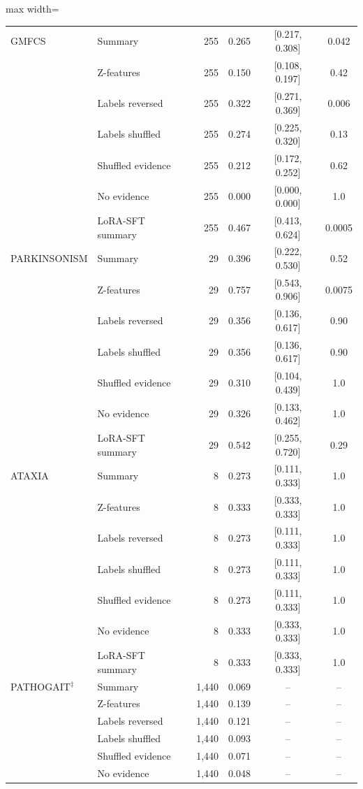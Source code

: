 \begin{table}[H]
\begin{adjustbox}{max width=\textwidth}
\begin{tabular}{llrccc}
\midrule
GMFCS & Summary & 255 & 0.265 & [0.217, 0.308] & 0.042 \\
& Z-features & 255 & 0.150 & [0.108, 0.197] & 0.42 \\
& Labels reversed & 255 & 0.322 & [0.271, 0.369] & 0.006 \\
& Labels shuffled & 255 & 0.274 & [0.225, 0.320] & 0.13 \\
& Shuffled evidence & 255 & 0.212 & [0.172, 0.252] & 0.62 \\
& No evidence & 255 & 0.000 & [0.000, 0.000] & 1.0 \\
& LoRA-SFT summary & 255 & 0.467 & [0.413, 0.624] & 0.0005 \\
\midrule
PARKINSONISM & Summary & 29 & 0.396 & [0.222, 0.530] & 0.52 \\
& Z-features & 29 & 0.757 & [0.543, 0.906] & 0.0075 \\
& Labels reversed & 29 & 0.356 & [0.136, 0.617] & 0.90 \\
& Labels shuffled & 29 & 0.356 & [0.136, 0.617] & 0.90 \\
& Shuffled evidence & 29 & 0.310 & [0.104, 0.439] & 1.0 \\
& No evidence & 29 & 0.326 & [0.133, 0.462] & 1.0 \\
& LoRA-SFT summary & 29 & 0.542 & [0.255, 0.720] & 0.29 \\
\midrule
ATAXIA & Summary & 8 & 0.273 & [0.111, 0.333] & 1.0 \\
& Z-features & 8 & 0.333 & [0.333, 0.333] & 1.0 \\
& Labels reversed & 8 & 0.273 & [0.111, 0.333] & 1.0 \\
& Labels shuffled & 8 & 0.273 & [0.111, 0.333] & 1.0 \\
& Shuffled evidence & 8 & 0.273 & [0.111, 0.333] & 1.0 \\
& No evidence & 8 & 0.333 & [0.333, 0.333] & 1.0 \\
& LoRA-SFT summary & 8 & 0.333 & [0.333, 0.333] & 1.0 \\
\midrule
PATHOGAIT$^{\ddagger}$ & Summary & 1,440 & 0.069 & -- & -- \\
& Z-features & 1,440 & 0.139 & -- & -- \\
& Labels reversed & 1,440 & 0.121 & -- & -- \\
& Labels shuffled & 1,440 & 0.093 & -- & -- \\
& Shuffled evidence & 1,440 & 0.071 & -- & -- \\
& No evidence & 1,440 & 0.048 & -- & -- \\

\end{tabular}
\end{adjustbox}
\end{table}
